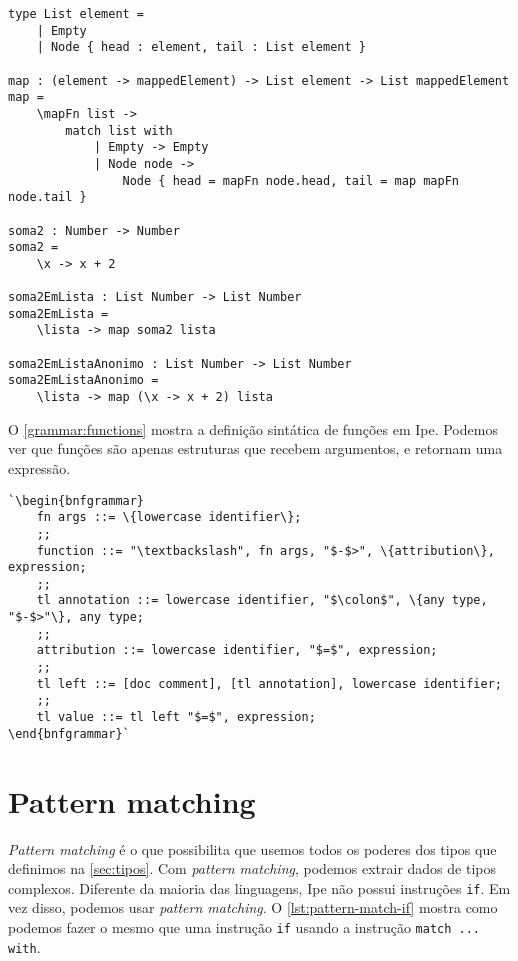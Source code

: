 \begin{lstlisting}[label={lst:chamando-funcoes-higher-order},caption={Exemplo de como passar uma função como argumento}]
type List element =
    | Empty
    | Node { head : element, tail : List element }

map : (element -> mappedElement) -> List element -> List mappedElement
map =
    \mapFn list ->
        match list with
            | Empty -> Empty
            | Node node ->
                Node { head = mapFn node.head, tail = map mapFn node.tail }

soma2 : Number -> Number
soma2 =
    \x -> x + 2

soma2EmLista : List Number -> List Number
soma2EmLista =
    \lista -> map soma2 lista

soma2EmListaAnonimo : List Number -> List Number
soma2EmListaAnonimo =
    \lista -> map (\x -> x + 2) lista
\end{lstlisting}

O \autoref{grammar:functions} mostra a definição sintática de funções em Ipe.
Podemos ver que funções são apenas estruturas que recebem argumentos, e retornam
uma expressão.

\begin{lstlisting}[label={grammar:functions},caption={Definição de funções em EBNF, onde \texttt{tl} significa \textit{top level}},escapechar=`,numbers=none]
`\begin{bnfgrammar}
    fn args ::= \{lowercase identifier\};
    ;;
    function ::= "\textbackslash", fn args, "$-$>", \{attribution\}, expression;
    ;;
    tl annotation ::= lowercase identifier, "$\colon$", \{any type, "$-$>"\}, any type;
    ;;
    attribution ::= lowercase identifier, "$=$", expression;
    ;;
    tl left ::= [doc comment], [tl annotation], lowercase identifier;
    ;;
    tl value ::= tl left "$=$", expression;
\end{bnfgrammar}`
\end{lstlisting}

\section{Pattern matching}\label{sec:pattern-matching}

\textit{Pattern matching} é o que possibilita que usemos todos os poderes dos
tipos que definimos na \autoref{sec:tipos}. Com \textit{pattern matching}, podemos
extrair dados de tipos complexos. Diferente da maioria das linguagens, Ipe não
possui instruções \texttt{if}. Em vez disso, podemos usar \textit{pattern matching}.
O \autoref{lst:pattern-match-if} mostra como podemos fazer o mesmo que uma
instrução \texttt{if} usando a instrução \texttt{match ... with}.


